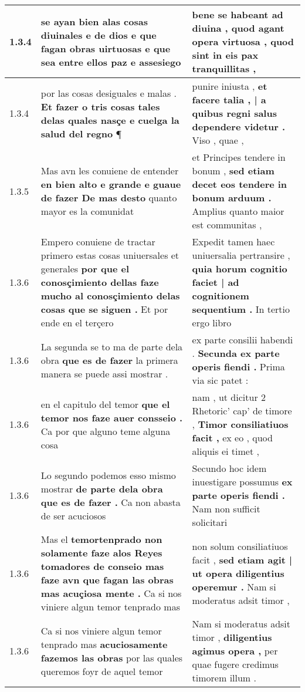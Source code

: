 \begin{tabular}{|p{1cm}|p{6.5cm}|p{6.5cm}|}
1.3.4 & se ayan bien alas cosas diuinales e de dios \textbf{ e que fagan obras uirtuosas } e que sea entre ellos paz e assesiego & bene se habeant ad diuina , \textbf{ quod agant opera virtuosa , } quod sint in eis pax tranquillitas , \\\hline
1.3.4 & por las cosas desiguales e malas . \textbf{ Et fazer o tris cosas tales delas quales nasçe e cuelga la salud del regno } ¶ & punire iniusta , \textbf{ et facere talia , | a quibus regni salus dependere videtur . } Viso , quae , \\\hline
1.3.5 & Mas avn les conuiene de entender \textbf{ en bien alto e grande e guaue de fazer De mas desto } quanto mayor es la comunidat & et Principes tendere in bonum , \textbf{ sed etiam decet eos tendere in bonum arduum . } Amplius quanto maior est communitas , \\\hline
1.3.6 & Empero conuiene de tractar primero estas cosas uniuersales et generales \textbf{ por que el conosçimiento dellas faze mucho al conosçimiento delas cosas que se siguen . } Et por ende en el terçero & Expedit tamen haec uniuersalia pertransire , \textbf{ quia horum cognitio faciet | ad cognitionem sequentium . } In tertio ergo libro \\\hline
1.3.6 & La segunda se to ma de parte dela obra \textbf{ que es de fazer } la primera manera se puede assi mostrar . & ex parte consilii habendi . \textbf{ Secunda ex parte operis fiendi . } Prima via sic patet : \\\hline
1.3.6 & en el capitulo del temor \textbf{ que el temor nos faze auer consseio . } Ca por que alguno teme alguna cosa & nam , ut dicitur 2 Rhetoric’ cap’ de timore , \textbf{ Timor consiliatiuos facit , } ex eo , quod aliquis ei timet , \\\hline
1.3.6 & Lo segundo podemos esso mismo mostrar \textbf{ de parte dela obra que es de fazer . } Ca non abasta de ser acuciosos & Secundo hoc idem inuestigare possumus \textbf{ ex parte operis fiendi . } Nam non sufficit solicitari \\\hline
1.3.6 & Mas el \textbf{ temortenprado non solamente faze alos Reyes tomadores de conseio mas faze avn que fagan las obras mas acuçiosa mente . } Ca si nos viniere algun temor tenprado mas & non solum consiliatiuos facit , \textbf{ sed etiam agit | ut opera diligentius operemur . } Nam si moderatus adsit timor , \\\hline
1.3.6 & Ca si nos viniere algun temor tenprado mas \textbf{ acuciosamente fazemos las obras } por las quales queremos foyr de aquel temor & Nam si moderatus adsit timor , \textbf{ diligentius agimus opera , } per quae fugere credimus timorem illum . \\\hline

\end{tabular}
